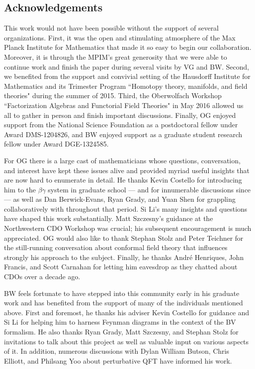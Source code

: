 \subsection{Acknowledgements}

This work would not have been possible without the support of several organizations.
First, it was the open and stimulating atmosphere of the Max Planck Institute for Mathematics 
that made it so easy to begin our collaboration.
Moreover, it is through the MPIM's great generosity that we were able to continue
work and finish the paper during several visits by VG and BW.
Second, we benefited from the support and convivial setting of the Hausdorff Institute for Mathematics
and its Trimester Program ``Homotopy theory, manifolds, and field theories" during the summer of 2015.
Third, the Oberwolfach Workshop ``Factorization Algebras and Functorial Field Theories" in May 2016
allowed us all to gather in person and finish important discussions.
Finally, OG enjoyed support from the National Science Foundation as a postdoctoral fellow under Award DMS-1204826, and BW enjoyed support as a graduate student research fellow under Award DGE-1324585.  

For OG there is a large cast of mathematicians whose questions, conversation, and interest 
have kept these issues alive and provided myriad useful insights that are now hard to enumerate in detail.
He thanks Kevin Costello for introducing him to the $\beta\gamma$ system in graduate school --- and for innumerable discussions since --- as well as Dan Berwick-Evans, Ryan Grady, and Yuan Shen
for grappling collaboratively with \cite{WG2} throughout that period.
Si Li's many insights and questions have shaped this work substantially.
Matt Szczesny's guidance at the Northwestern CDO Workshop was crucial; 
his subsequent encouragement is much appreciated.
OG would also like to thank Stephan Stolz and Peter Teichner for the still-running conversation about
conformal field theory that influences strongly his approach to the subject.
Finally, he thanks Andr\'e Henriques, John Francis, and Scott Carnahan for letting him eavesdrop as they chatted about CDOs over a decade ago.

BW feels fortunate to have stepped into this community early in his graduate work and has benefited from the support of many of the individuals mentioned above. First and foremost, he thanks his adviser Kevin Costello for guidance and Si Li for helping him to harness Feynman diagrams in the context of the BV formalism. He also thanks Ryan Grady, Matt Szczesny, and Stephan Stolz for invitations to talk about this project as well as valuable input on various aspects of it. In addition, numerous discussions with Dylan William Butson, Chris Elliott, and Philsang Yoo about perturbative QFT have informed his work. 

